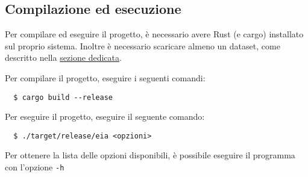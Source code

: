 \documentclass{ol-softwaremanual}
\begin{document}
\subsection{Compilazione ed esecuzione}
Per compilare ed eseguire il progetto, è necessario avere Rust (e cargo) installato sul proprio sistema.
Inoltre è necessario scaricare almeno un dataset, come descritto nella \hyperref[sec:dataset]{sezione dedicata}.

Per compilare il progetto, eseguire i seguenti comandi:
\begin{lstlisting}
  $ cargo build --release
\end{lstlisting}

Per eseguire il progetto, eseguire il seguente comando:
\begin{lstlisting}
  $ ./target/release/eia <opzioni>
\end{lstlisting}

Per ottenere la lista delle opzioni disponibili, è possibile eseguire il programma con l'opzione \texttt{-h}
\end{document}
